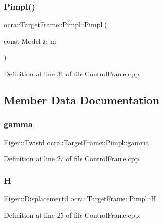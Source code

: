 \subsubsection{\texorpdfstring{Pimpl()}{Pimpl()}}
{\footnotesize\ttfamily ocra\+::\+Target\+Frame\+::\+Pimpl\+::\+Pimpl (\begin{DoxyParamCaption}\item[{const Model \&}]{m }\end{DoxyParamCaption})\hspace{0.3cm}{\ttfamily [inline]}}



Definition at line 31 of file Control\+Frame.\+cpp.



\subsection{Member Data Documentation}
\hypertarget{structocra_1_1TargetFrame_1_1Pimpl_a1c9e215a8979352974e88f7606a738b7}{}\label{structocra_1_1TargetFrame_1_1Pimpl_a1c9e215a8979352974e88f7606a738b7} 
\subsubsection{\texorpdfstring{gamma}{gamma}}
{\footnotesize\ttfamily Eigen\+::\+Twistd ocra\+::\+Target\+Frame\+::\+Pimpl\+::gamma}



Definition at line 27 of file Control\+Frame.\+cpp.

\hypertarget{structocra_1_1TargetFrame_1_1Pimpl_a84a376863b43fa29115be56fa326d8df}{}\label{structocra_1_1TargetFrame_1_1Pimpl_a84a376863b43fa29115be56fa326d8df} 
\subsubsection{\texorpdfstring{H}{H}}
{\footnotesize\ttfamily Eigen\+::\+Displacementd ocra\+::\+Target\+Frame\+::\+Pimpl\+::H}



Definition at line 25 of file Control\+Frame.\+cpp.

\hypertarget{structocra_1_1TargetFrame_1_1Pimpl_afc2a059aca6dc89c5da22b1b86b36922}{}\label{structocra_1_1TargetFrame_1_1Pimpl_afc2a059aca6dc89c5da22b1b86b36922} 
